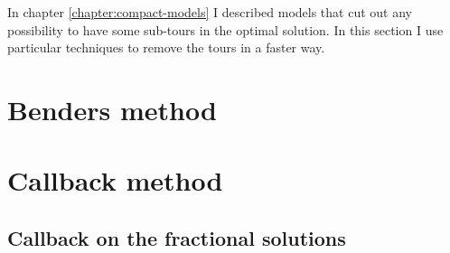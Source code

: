In chapter \ref{chapter:compact-models} I described models that cut out any possibility to have some sub-tours in the optimal solution. In this section I use particular techniques to remove the tours in a faster way.

\section{Benders method}
\label{chapter:benders}


\section{Callback method}
\label{chapter:callback}


\subsection{Callback on the fractional solutions}
\label{chapter:callback-fractional}
